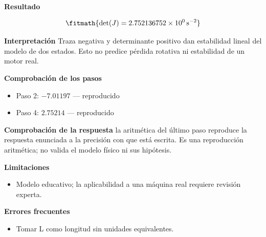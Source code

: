 \documentclass[10pt,openany]{book}
\begin{document}
\begin{tcolorbox}[title={Problema resuelto 4}, studiumworked, breakable]
\noindent\textbf{Resultado}

\[
\fitmath{\det(J)=2.752136752\times10^{0}\,\mathrm{s}^{-2}}
\]

\noindent\textbf{Interpretación}
Traza negativa y determinante positivo dan estabilidad lineal del modelo de dos estados. Esto no predice pérdida rotativa ni estabilidad de un motor real.

\noindent\textbf{Comprobación de los pasos}
\begin{itemize}
\item Paso 2: $-7.01197$ — reproducido
\item Paso 4: $2.75214$ — reproducido
\end{itemize}

\noindent\textbf{Comprobación de la respuesta} la aritmética del último paso reproduce la respuesta enunciada a la precisión con que está escrita. Es una reproducción aritmética; no valida el modelo físico ni sus hipótesis.

\noindent\textbf{Limitaciones}
\begin{itemize}
\item Modelo educativo; la aplicabilidad a una máquina real requiere revisión experta.
\end{itemize}

\noindent\textbf{Errores frecuentes}
\begin{itemize}
\item Tomar L como longitud sin unidades equivalentes.
\end{itemize}
\end{tcolorbox}
\end{document}
